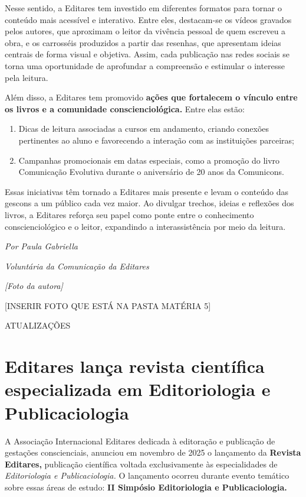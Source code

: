 \documentclass[
]{article}
\begin{document}
Nesse sentido, a Editares tem investido em diferentes formatos para tornar o conteúdo mais acessível e interativo. Entre eles, destacam-se os vídeos gravados pelos autores, que aproximam o leitor da vivência pessoal de quem escreveu a obra, e os carrosséis produzidos a partir das resenhas, que apresentam ideias centrais de forma visual e objetiva. Assim, cada publicação nas redes sociais se torna uma oportunidade de aprofundar a compreensão e estimular o interesse pela leitura.

Além disso, a Editares tem promovido \textbf{ações que fortalecem o vínculo entre os livros e a comunidade conscienciológica.} Entre elas estão:

\begin{enumerate}
\def\labelenumi{\arabic{enumi}.}
\item
  Dicas de leitura associadas a cursos em andamento, criando conexões pertinentes ao aluno e favorecendo a interação com as instituições parceiras;
\item
  Campanhas promocionais em datas especiais, como a promoção do livro Comunicação Evolutiva durante o aniversário de 20 anos da Comunicons.
\end{enumerate}

Essas iniciativas têm tornado a Editares mais presente e levam o conteúdo das gescons a um público cada vez maior. Ao divulgar trechos, ideias e reflexões dos livros, a Editares reforça seu papel como ponte entre o conhecimento conscienciológico e o leitor, expandindo a interassistência por meio da leitura.

\emph{Por Paula Gabriella}

\emph{Voluntária da Comunicação da Editares}

\emph{{[}Foto da autora{]}}

{[}INSERIR FOTO QUE ESTÁ NA PASTA MATÉRIA 5{]}

ATUALIZAÇÕES

\section{Editares lança revista científica especializada em Editoriologia e Publicaciologia}\label{editares-lanuxe7a-revista-cientuxedfica-especializada-em-editoriologia-e-publicaciologia}

A Associação Internacional Editares dedicada à editoração e publicação de gestações conscienciais, anunciou em novembro de 2025 o lançamento da \textbf{Revista Editares,} publicação científica voltada exclusivamente às especialidades de \emph{Editoriologia e Publicaciologia.} O lançamento ocorreu durante evento temático sobre essas áreas de estudo: \textbf{II Simpósio Editoriologia e Publicaciologia.}
\end{document}
